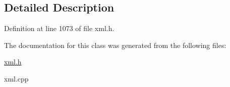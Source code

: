 \subsection{Detailed Description}


Definition at line 1073 of file xml.h.



The documentation for this class was generated from the following files:\begin{DoxyCompactItemize}
\item 
\hyperlink{xml_8h}{xml.h}\item 
xml.cpp\end{DoxyCompactItemize}
